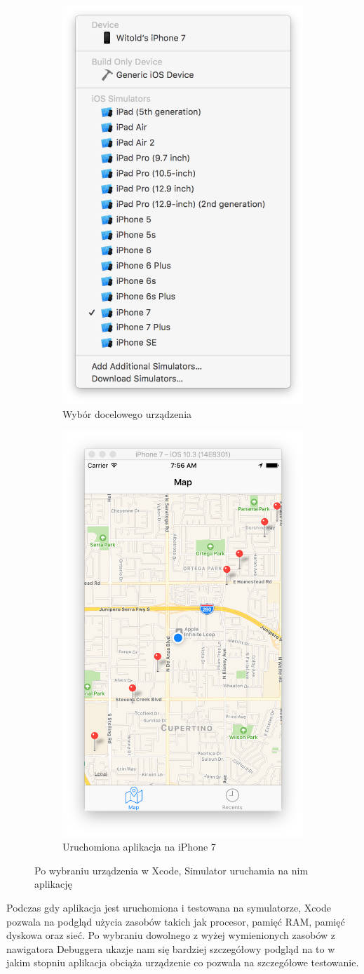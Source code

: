 \begin{figure}[ht!]
\centering
\begin{subfigure}{.5\textwidth}
  \centering
  \includegraphics[width=.4\linewidth]{images/chapter-2-image-3-target.png}
  \caption{Wybór docelowego urządzenia}
  \label{chapter-2-image-3-target}
\end{subfigure}%
\begin{subfigure}{.5\textwidth}
  \centering
  \includegraphics[width=.4\linewidth]{images/chapter-2-image-4-simulator.png}
  \caption{Uruchomiona aplikacja na iPhone 7}
  \label{chapter-2-image-4-simulator}
\end{subfigure}
\caption{Po wybraniu urządzenia w Xcode, Simulator uruchamia na nim aplikację}
\label{chapter-2-image-4-5}
\end{figure}

Podczas gdy aplikacja jest uruchomiona i testowana na symulatorze, Xcode pozwala na podgląd użycia zasobów takich jak procesor, pamięć
RAM, pamięć dyskowa oraz sieć. Po wybraniu dowolnego z wyżej wymienionych zasobów z nawigatora Debuggera ukazje nam się bardziej
szczegółowy podgląd na to w jakim stopniu aplikacja obciąża urządzenie co pozwala na szczegółowe testowanie.

